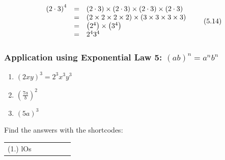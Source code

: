     \begin{equation}
    \begin{array}{ccc}\hfill {\left(2\ensuremath{\cdot}3\right)}^{4}& =& \left(2\ensuremath{\cdot}3\right)\ensuremath{\times}\left(2\ensuremath{\cdot}3\right)\ensuremath{\times}\left(2\ensuremath{\cdot}3\right)\ensuremath{\times}\left(2\ensuremath{\cdot}3\right)\hfill \\ & =& \left(2\ensuremath{\times}2\ensuremath{\times}2\ensuremath{\times}2\right)\ensuremath{\times}\left(3\ensuremath{\times}3\ensuremath{\times}3\ensuremath{\times}3\right)\hfill \\ & =& \left({2}^{4}\right)\ensuremath{\times}\left({3}^{4}\right)\hfill \\ & =& {2}^{4}{3}^{4}\hfill \end{array}\tag{5.14}
      \end{equation}
\label{m38359*secfhsst!!!underscore!!!id1581}
            \subsubsection{ Application using Exponential Law 5: ${\left(ab\right)}^{n}={a}^{n}{b}^{n}$ }
            \nopagebreak
        \label{m38359*id66288}\begin{enumerate}[noitemsep, label=\textbf{\arabic*}. ] 
            \label{m38359*uid31}\item 
            ${\left(2xy\right)}^{3}={2}^{3}{x}^{3}{y}^{3}$
      \label{m38359*uid32}\item 
        ${\left(\frac{7a}{b}\right)}^{2}$
      \label{m38359*uid33}\item 
        ${\left(5a\right)}^{3}$
\newline
\newline
          \end{enumerate}
      \label{m38359*uid34}
\par {} Find the answers with the shortcodes:
 \par \begin{tabular}[h]{cccccc}
 (1.) lOs  & \end{tabular}
